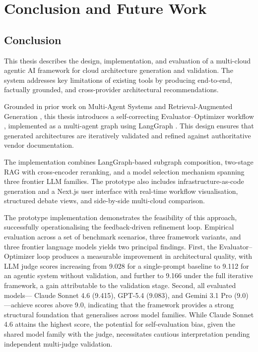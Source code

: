 \chapter{Conclusion and Future Work}

\section{Conclusion}

This thesis describes the design, implementation, and evaluation of a multi-cloud agentic AI framework for cloud architecture generation and validation. The system addresses key limitations of existing tools by producing end-to-end, factually grounded, and cross-provider architectural recommendations.

Grounded in prior work on Multi-Agent Systems \cite{sycara1998multiagent} and Retrieval-Augmented Generation \cite{lewis2020rag}, this thesis introduces a self-correcting Evaluator–Optimizer workflow \cite{anthropic2024agents}, implemented as a multi-agent graph using LangGraph \cite{langgraph2024docs}. This design ensures that generated architectures are iteratively validated and refined against authoritative vendor documentation.

The implementation combines LangGraph-based subgraph composition, two-stage RAG with cross-encoder reranking, and a model selection mechanism spanning three frontier LLM families. The prototype also includes infrastructure-as-code generation and a Next.js user interface with real-time workflow visualisation, structured debate views, and side-by-side multi-cloud comparison.

The prototype implementation demonstrates the feasibility of this approach, successfully operationalising the feedback-driven refinement loop. Empirical evaluation across a set of benchmark scenarios, three framework variants, and three frontier language models yields two principal findings. First, the Evaluator–Optimizer loop produces a measurable improvement in architectural quality, with LLM judge scores increasing from 9.028 for a single-prompt baseline to 9.112 for an agentic system without validation, and further to 9.166 under the full iterative framework, a gain attributable to the validation stage. Second, all evaluated models— Claude Sonnet 4.6 (9.415), GPT-5.4 (9.083), and Gemini 3.1 Pro (9.0)—achieve scores above 9.0, indicating that the framework provides a strong structural foundation that generalises across model families. While Claude Sonnet 4.6 attains the highest score, the potential for self-evaluation bias, given the shared model family with the judge, necessitates cautious interpretation pending independent multi-judge validation.

